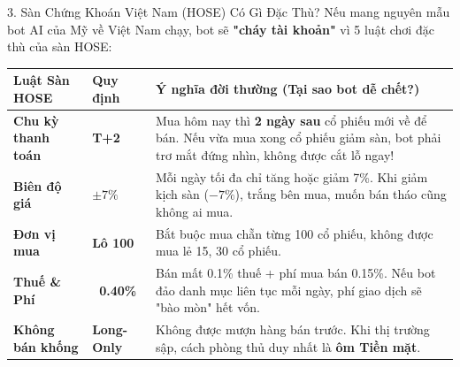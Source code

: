 \documentclass[aspectratio=169, 10pt]{beamer}
\begin{document}
\begin{frame}{3. Sàn Chứng Khoán Việt Nam (HOSE) Có Gì Đặc Thù?}
  Nếu mang nguyên mẫu bot AI của Mỹ về Việt Nam chạy, bot sẽ \textbf{"cháy tài khoản"} vì 5 luật chơi đặc thù của sàn HOSE:

  \vspace{1ex}
  \begin{table}[h]
    \centering
    \small
    \begin{tabular}{p{2.6cm} p{1.6cm} p{8.8cm}}
      \toprule
      \textbf{Luật Sàn HOSE} & \textbf{Quy định} & \textbf{Ý nghĩa đời thường (Tại sao bot dễ chết?)} \\
      \midrule
      \textbf{Chu kỳ thanh toán} & \textbf{T+2} & Mua hôm nay thì \textbf{2 ngày sau} cổ phiếu mới về để bán. Nếu vừa mua xong cổ phiếu giảm sàn, bot phải trơ mắt đứng nhìn, không được cắt lỗ ngay! \\
      \midrule
      \textbf{Biên độ giá} & \textbf{$\pm 7\%$} & Mỗi ngày tối đa chỉ tăng hoặc giảm 7\%. Khi giảm kịch sàn ($-7\%$), trắng bên mua, muốn bán tháo cũng không ai mua. \\
      \midrule
      \textbf{Đơn vị mua} & \textbf{Lô 100} & Bắt buộc mua chẵn từng 100 cổ phiếu, không được mua lẻ 15, 30 cổ phiếu. \\
      \midrule
      \textbf{Thuế \& Phí} & \textbf{~0.40\%} & Bán mất 0.1\% thuế + phí mua bán 0.15\%. Nếu bot đảo danh mục liên tục mỗi ngày, phí giao dịch sẽ "bào mòn" hết vốn. \\
      \midrule
      \textbf{Không bán khống} & \textbf{Long-Only} & Không được mượn hàng bán trước. Khi thị trường sập, cách phòng thủ duy nhất là \textbf{ôm Tiền mặt}. \\
      \bottomrule
    \end{tabular}
  \end{table}
\end{frame}
\end{document}
